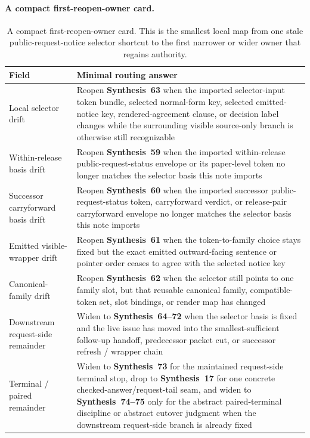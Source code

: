 \documentclass[11pt]{article}
\begin{document}
\paragraph{A compact first-reopen-owner card.}
\begin{table}[t]
\centering
\small
\begin{tabularx}{\linewidth}{@{}lX@{}}
\toprule
Field & Minimal routing answer \\
\midrule
Local selector drift & Reopen \textbf{Synthesis~63} when the imported selector-input token bundle, selected normal-form key, selected emitted-notice key, rendered-agreement clause, or decision label changes while the surrounding visible source-only branch is otherwise still recognizable \\
Within-release basis drift & Reopen \textbf{Synthesis~59} when the imported within-release public-request-status envelope or its paper-level token no longer matches the selector basis this note imports \\
Successor carryforward basis drift & Reopen \textbf{Synthesis~60} when the imported successor public-request-status token, carryforward verdict, or release-pair carryforward envelope no longer matches the selector basis this note imports \\
Emitted visible-wrapper drift & Reopen \textbf{Synthesis~61} when the token-to-family choice stays fixed but the exact emitted outward-facing sentence or pointer order ceases to agree with the selected notice key \\
Canonical-family drift & Reopen \textbf{Synthesis~62} when the selector still points to one family slot, but that reusable canonical family, compatible-token set, slot bindings, or render map has changed \\
Downstream request-side remainder & Widen to \textbf{Synthesis~64--72} when the selector basis is fixed and the live issue has moved into the smallest-sufficient follow-up handoff, predecessor packet cut, or successor refresh / wrapper chain \\
Terminal / paired remainder & Widen to \textbf{Synthesis~73} for the maintained request-side terminal stop, drop to \textbf{Synthesis~17} for one concrete checked-answer/request-tail seam, and widen to \textbf{Synthesis~74--75} only for the abstract paired-terminal discipline or abstract cutover judgment when the downstream request-side branch is already fixed \\
\bottomrule
\end{tabularx}
\caption{A compact first-reopen-owner card. This is the smallest local map from one stale public-request-notice selector shortcut to the first narrower or wider owner that regains authority.}
\label{tab:first-reopen-owner-card-public-request-notice-selections}
\end{table}
\end{document}
